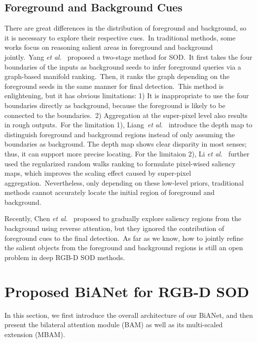 \documentclass[journal]{IEEEtran}
\def\etal{{\em et al.~}}
\begin{document}
\subsection{Foreground and Background Cues}
\vspace{-3pt}
There are great differences in the distribution of foreground and background, so it is necessary to explore their respective cues.\
In traditional methods, some works focus on reasoning salient areas in foreground and background jointly.\ 
Yang \etal\cite{yang2013saliency} proposed a two-stage method for SOD.\  
It first takes the four boundaries of the inputs as background seeds to infer foreground queries via a graph-based manifold ranking.\ 
Then, it ranks the graph depending on the foreground seeds in the same manner for final detection.\ 
This method is enlightening, but it has obvious limitations: 1) It is inappropriate to use the four boundaries directly as background, because the foreground is likely to be connected to the boundaries.\ 
2) Aggregation at the super-pixel level also results in rough outputs.\ 
For the limitation 1), 
Liang~\etal\cite{liang2018stereoscopic} introduce the depth map to distinguish foreground and background regions instead of only assuming the boundaries as background. The depth map shows clear disparity in most senses; thus, it can support more precise locating.
For the limitaion 2), Li \etal\cite{li2015robust} further used the regularized random walks ranking to formulate pixel-wised saliency maps, which improves the scaling effect caused by super-pixel aggregation.\ 
Nevertheless, only depending on these low-level priors, traditional methods cannot accurately locate the initial region of foreground and background.  

Recently, Chen \etal\cite{chen2018reverse} proposed to gradually explore saliency regions from the background using reverse attention, but they ignored the contribution of foreground cues to the final detection.\ 
As far as we know, how to jointly refine the salient objects from the foreground and background regions is still an open problem in deep RGB-D SOD methods.






\section{Proposed BiANet for RGB-D SOD}
\label{sec:method}
In this section, we first introduce the overall architecture of our BiANet, and then present the bilateral attention module (BAM) as well as its multi-scaled extension (MBAM).
\end{document}

